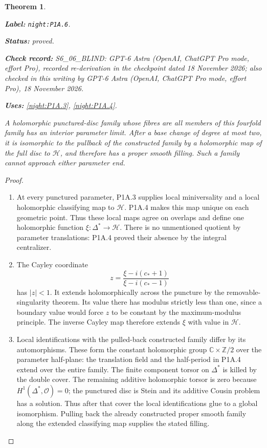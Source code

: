 \documentclass[11pt,a4paper]{article}
\newtheorem{theorem}{Theorem}[section]
\theoremstyle{definition}
\newcommand{\StatementRecord}[4]{\par\smallskip\begingroup\upshape\raggedright\noindent\textbf{Label:} \nolinkurl{#1}.\par\noindent\textbf{Status:} #2.\par\noindent\textbf{Check record:} #3.\par\noindent\textbf{Uses:} #4.\par\endgroup\smallskip}
\newcommand{\CurrentChecker}{GPT-6 Astra (OpenAI, ChatGPT Pro mode, effort Pro), 18 November 2026}
\begin{document}
\begin{theorem}\label{night:P1A.6}
\StatementRecord{night:P1A.6}{proved}{S6\_06\_BLIND: GPT-6 Astra (OpenAI, ChatGPT Pro mode, effort Pro), recorded re-derivation in the checkpoint dated 18 November 2026; also checked in this writing by \CurrentChecker}{\cref{night:P1A.3}, \cref{night:P1A.4}}
A holomorphic punctured-disc family whose fibres are all
members of this fourfold family has an interior parameter
limit. After a base change of degree at most two, it is
isomorphic to the pullback of the constructed family by
a holomorphic map of the full disc to $\mathcal H$, and
therefore has a proper smooth filling. Such a family
cannot approach either parameter end.
\end{theorem}
\begin{proof}
\begin{enumerate}[label=\arabic*.]
\item At every punctured parameter, P1A.3 supplies local
miniversality and a local holomorphic classifying map to
$\mathcal H$. P1A.4 makes this map unique on each geometric
point. Thus these local maps agree on overlaps and define
one holomorphic function $\xi:\Delta^*\to\mathcal H$.
There is no unmentioned quotient by parameter translations:
P1A.4 proved their absence by the integral centralizer.

\item The Cayley coordinate
\[
 z=\frac{\xi-i(c_*+1)}{\xi-i(c_*-1)}
\]
has $|z|<1$. It extends holomorphically across the puncture
by the removable-singularity theorem. Its value there has
modulus strictly less than one, since a boundary value
would force $z$ to be constant by the maximum-modulus
principle. The inverse Cayley map therefore extends
$\xi$ with value in $\mathcal H$.

\item Local identifications with the pulled-back constructed
family differ by its automorphisms. These form the constant
holomorphic group $\mathbb C\times\mathbb Z/2$ over the
parameter half-plane: the translation field and the
half-period in P1A.4 extend over the entire family.
The finite component torsor on $\Delta^*$ is killed by
the double cover. The remaining additive holomorphic
torsor is zero because $H^1(\Delta^*,\mathcal O)=0$;
the punctured disc is Stein and its additive Cousin
problem has a solution. Thus after that cover the local
identifications glue to a global isomorphism. Pulling
back the already constructed proper smooth family along
the extended classifying map supplies the stated filling.

\end{enumerate}
\end{proof}
\end{document}

